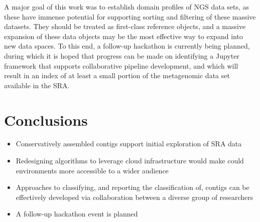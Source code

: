 A major goal of this work was to establish domain profiles of NGS data sets, as
these have immense potential for supporting sorting and filtering of these
massive datasets. They should be treated as first-class reference objects, and
a massive expansion of these data objects may be the most effective way to
expand into new data spaces. To this end, a follow-up hackathon is currently
being planned, during which it is hoped that progress can be made on
identifying a Jupyter framework that supports collaborative pipeline
development, and which will result in an index of at least a small portion of
the metagenomic data set available in the SRA.


\section{Conclusions}
  \begin{itemize}
    \item Conservatively assembled contigs support initial exploration of SRA data
    \item Redesigning algorithms to leverage cloud infrastructure would make
          could environments more accessible to a wider audience
    \item Approaches to classifying, and reporting the classification of,
          contigs can be effectively developed via collaboration between a
          diverse group of researchers
    \item A follow-up hackathon event is planned

  \end{itemize}
